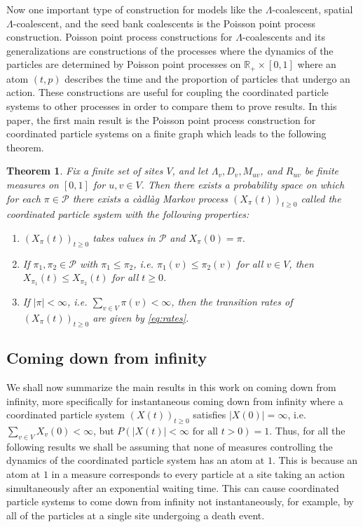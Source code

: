 \documentclass[11pt]{article}
\newtheorem{theorem}{Theorem}
\theoremstyle{definition}
\newcommand{\R}{\mathbb{R}}
\begin{document}
\noindent Now one important type of construction for models like the $\Lambda$-coalescent, spatial $\Lambda$-coalescent, and the seed bank coalescents is the Poisson point process construction. Poisson point process constructions for $\Lambda$-coalescents and its generalizations are constructions of the processes where the dynamics of the particles are determined by Poisson point processes on $\R_+ \times [0,1]$ where an atom $(t,p)$ describes the time and the proportion of particles that undergo an action. These constructions are useful for coupling the coordinated particle systems to other processes in order to compare them to prove results. In this paper, the first main result is the Poisson point process construction for coordinated particle systems on a finite graph which leads to the following theorem.

\begin{theorem}\label{T:PPPconstruction}
    Fix a finite set of sites $V$, and let $\Lambda_v, D_v, M_{uv}$, and $R_{uv}$ be finite measures on $[0,1]$ for $u,v \in V$. Then there exists a probability space on which for each $\pi \in \mathcal{P}$ there exists a c\`adl\`ag Markov process $(X_\pi(t))_{t \geq 0}$ called the coordinated particle system with the following properties:

    \begin{enumerate}
        \item[(a)] $(X_\pi(t))_{t \geq 0}$ takes values in $\mathcal{P}$ and $X_\pi(0) = \pi$.

        \item[(b)] If $\pi_1, \pi_2 \in \mathcal{P}$ with $\pi_1 \leq \pi_2$, i.e. $\pi_1(v) \leq \pi_2(v)$ for all $v \in V$, then $X_{\pi_1}(t) \leq X_{\pi_2}(t)$ for all $t \geq 0$.

        \item[(c)] If $|\pi| < \infty$, i.e. $\sum_{v \in V} \pi(v) < \infty$, then the transition rates of $(X_\pi(t))_{t \geq 0}$ are given by \eqref{eq:rates}.
    \end{enumerate}
\end{theorem}

\subsection{Coming down from infinity}

\noindent We shall now summarize the main results in this work on coming down from infinity, more specifically for instantaneous coming down from infinity where a coordinated particle system $(X(t))_{t \geq 0}$ satisfies $|X(0)| = \infty$, i.e. $\sum_{v \in V} X_v(0) < \infty$, but $P(|X(t)| < \infty \text{ for all } t> 0) = 1$. Thus, for all the following results we shall be assuming that none of measures controlling the dynamics of the coordinated particle system has an atom at $1$. This is because an atom at $1$ in a measure corresponds to every particle at a site taking an action simultaneously after an exponential waiting time. This can cause coordinated particle systems to come down from infinity not instantaneously, for example, by all of the particles at a single site undergoing a death event.
\medskip
\end{document}
